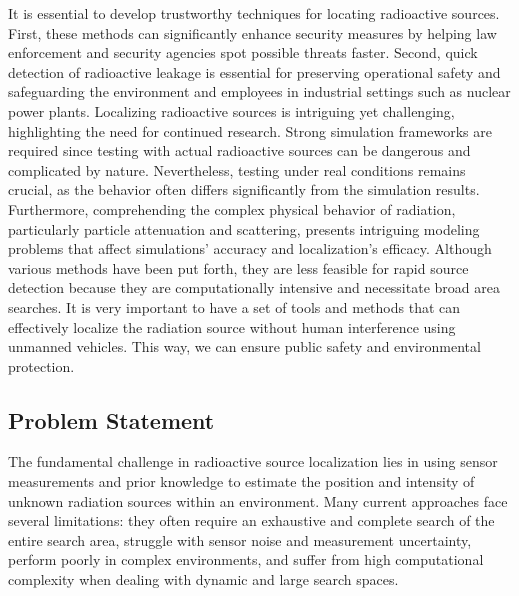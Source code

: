 \documentclass[../report.tex]{subfiles}
\begin{document}
    It is essential to develop trustworthy techniques for locating radioactive sources. First, these methods can significantly enhance security measures by helping law enforcement and security 
    agencies spot possible threats faster. Second, quick detection of radioactive leakage is essential for preserving operational safety and safeguarding the environment and employees in industrial 
    settings such as nuclear power plants. Localizing radioactive sources is intriguing yet challenging, highlighting the need for continued research. Strong simulation frameworks are required 
    since testing with actual radioactive sources can be dangerous and complicated by nature. Nevertheless, testing under real conditions remains crucial, as the behavior often differs significantly
    from the simulation results. Furthermore, comprehending the complex physical behavior of radiation, particularly particle 
    attenuation and scattering, presents intriguing modeling problems that affect simulations' accuracy and localization's efficacy. Although various methods have been put forth, they are less 
    feasible for rapid source detection because they are computationally intensive and necessitate broad area searches.  It is very important to have a set of tools and methods that can effectively
    localize the radiation source without human interference using unmanned vehicles. This way, we can ensure public safety and environmental protection.

    \subsection{Problem Statement}
    \label{sec:introduction:problem_statement}

    The fundamental challenge in radioactive source localization lies in using sensor measurements and prior knowledge to estimate the position and intensity of unknown radiation 
    sources within an environment. Many current approaches \cite{marques2024radioactive}\cite{papadimitropoulos2015radioactive}\cite{vilim2009radtrac}\cite{howse2001least} \cite{rao2008identification} 
    face several limitations: they often require an exhaustive and complete search of the entire search area, struggle with sensor noise and measurement 
    uncertainty, perform poorly in complex environments, and suffer from high computational complexity when dealing with dynamic and large search spaces.
   
\end{document}
